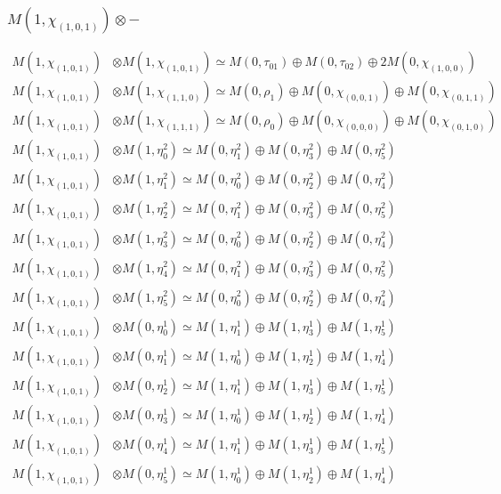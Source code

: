 \subsubsection{$ M(1,\chi_{(1,0,1)})\otimes -$}
\begin{align*}
M(1,\chi_{(1,0,1)}) &\otimes M(1,\chi_{(1,0,1)}) \simeq M(0,\tau_{01}) \oplus M(0,\tau_{02}) \oplus 2 M(0,\chi_{(1,0,0)}) \\
M(1,\chi_{(1,0,1)}) &\otimes M(1,\chi_{(1,1,0)}) \simeq M(0,\rho_{1}) \oplus M(0,\chi_{(0,0,1)}) \oplus M(0,\chi_{(0,1,1)}) \\
M(1,\chi_{(1,0,1)}) &\otimes M(1,\chi_{(1,1,1)}) \simeq M(0,\rho_{0}) \oplus M(0,\chi_{(0,0,0)}) \oplus M(0,\chi_{(0,1,0)}) \\
M(1,\chi_{(1,0,1)}) &\otimes M(1,\eta^{2}_{0}) \simeq M(0,\eta^{2}_{1}) \oplus M(0,\eta^{2}_{3}) \oplus M(0,\eta^{2}_{5}) \\
M(1,\chi_{(1,0,1)}) &\otimes M(1,\eta^{2}_{1}) \simeq M(0,\eta^{2}_{0}) \oplus M(0,\eta^{2}_{2}) \oplus M(0,\eta^{2}_{4}) \\
M(1,\chi_{(1,0,1)}) &\otimes M(1,\eta^{2}_{2}) \simeq M(0,\eta^{2}_{1}) \oplus M(0,\eta^{2}_{3}) \oplus M(0,\eta^{2}_{5}) \\
M(1,\chi_{(1,0,1)}) &\otimes M(1,\eta^{2}_{3}) \simeq M(0,\eta^{2}_{0}) \oplus M(0,\eta^{2}_{2}) \oplus M(0,\eta^{2}_{4}) \\
M(1,\chi_{(1,0,1)}) &\otimes M(1,\eta^{2}_{4}) \simeq M(0,\eta^{2}_{1}) \oplus M(0,\eta^{2}_{3}) \oplus M(0,\eta^{2}_{5}) \\
M(1,\chi_{(1,0,1)}) &\otimes M(1,\eta^{2}_{5}) \simeq M(0,\eta^{2}_{0}) \oplus M(0,\eta^{2}_{2}) \oplus M(0,\eta^{2}_{4}) \\
M(1,\chi_{(1,0,1)}) &\otimes M(0,\eta^{1}_{0}) \simeq M(1,\eta^{1}_{1}) \oplus M(1,\eta^{1}_{3}) \oplus M(1,\eta^{1}_{5}) \\
M(1,\chi_{(1,0,1)}) &\otimes M(0,\eta^{1}_{1}) \simeq M(1,\eta^{1}_{0}) \oplus M(1,\eta^{1}_{2}) \oplus M(1,\eta^{1}_{4}) \\
M(1,\chi_{(1,0,1)}) &\otimes M(0,\eta^{1}_{2}) \simeq M(1,\eta^{1}_{1}) \oplus M(1,\eta^{1}_{3}) \oplus M(1,\eta^{1}_{5}) \\
M(1,\chi_{(1,0,1)}) &\otimes M(0,\eta^{1}_{3}) \simeq M(1,\eta^{1}_{0}) \oplus M(1,\eta^{1}_{2}) \oplus M(1,\eta^{1}_{4}) \\
M(1,\chi_{(1,0,1)}) &\otimes M(0,\eta^{1}_{4}) \simeq M(1,\eta^{1}_{1}) \oplus M(1,\eta^{1}_{3}) \oplus M(1,\eta^{1}_{5}) \\
M(1,\chi_{(1,0,1)}) &\otimes M(0,\eta^{1}_{5}) \simeq M(1,\eta^{1}_{0}) \oplus M(1,\eta^{1}_{2}) \oplus M(1,\eta^{1}_{4}) \\

\end{align*}
